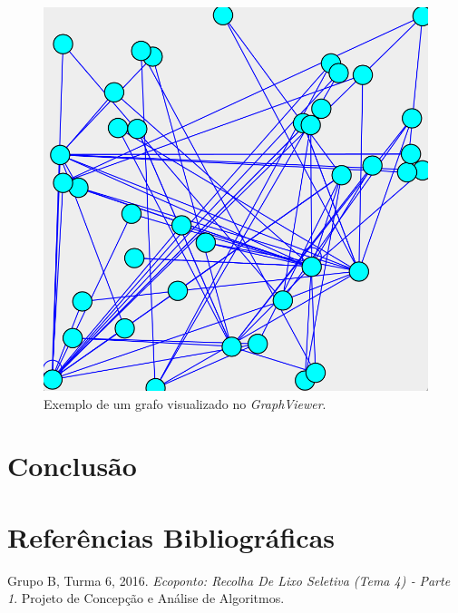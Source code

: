 \documentclass[article, a4paper, 12pt, oneside]{memoir}
\begin{document}
\begin{figure}[h!]
  \centerline{\includegraphics[scale=0.6]{graphviewer.png}}
  \caption{Exemplo de um grafo visualizado no \textit{GraphViewer}.}
\end{figure}


\newpage
\chapter[Conclusão][Conclusão]{Conclusão} \label{\thechapter}



\newpage
\chapter[Referências Bibliográficas][Referências Bibliográficas]{Referências Bibliográficas} \label{\thechapter}
Grupo B, Turma 6, 2016. \textit{Ecoponto: Recolha De Lixo Seletiva (Tema 4) ‐ Parte 1}. Projeto de Concepção e Análise de Algoritmos.
\end{document}
